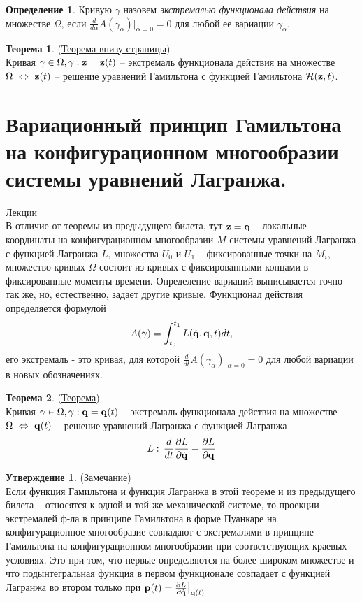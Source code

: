 \documentclass[specialist, subf, href, colorlinks=true, 12pt, times, mtpro, final]{disser}
\theoremstyle{definition}
\newtheorem{defn}{Определение}[section]
\newtheorem{state}{Утверждение}[section]
\newtheorem{theorem}{Теорема}[section]
\def\bfqd{\dot{\bfq}}
\begin{document}
    \begin{defn}
    Кривую $\gamma$  назовем {\it экстремалью функционала действия} на множестве $\Omega$, если $\frac{d}{d\alpha} A(\gamma_\alpha)|_{\alpha=0}=0$ для любой ее вариации $\gamma_\alpha$.
    \end{defn}
        
    \begin{theorem}(\hyperlink {lects.44}{Теорема внизу страницы})\\
    Кривая $\gamma \in \Omega, \gamma: \mathbf{z}=\mathbf{z}(t)$ \--- экстремаль функционала действия на множестве $\Omega\,\, \Leftrightarrow\,\, \mathbf{z}(t)$ \--- решение уравнений Гамильтона с функцией Гамильтона $\mathcal{H}(\mathbf{z}, t)$.
    \end{theorem}
    
    
    \section{Вариационный принцип Гамильтона на конфигурационном многообразии системы уравнений Лагранжа.}
     \label{25}
    \hyperlink {lects.45}{Лекции}\\
    В отличие от теоремы из предыдущего билета, тут $\mathbf{z}=\mathbf{q}$ -- локальные координаты
    на конфигурационном многообразии $M$ системы уравнений Лагранжа с функцией Лагранжа $L$,
    множества $U_0$ и $U_1$ -- фиксированные точки на $M_i$, множество кривых $\Omega$
    состоит из кривых с фиксированными концами в фиксированные моменты времени. Определение
    вариаций выписывается точно так же, но, естественно, задает другие кривые. Функционал
    действия определяется формулой
    $$A(\gamma) = \int_{t_0}^{t_1} L(\bfqd,\bfq,t)dt,$$
    его экстремаль - это кривая, для которой $\frac{d}{dt}A(\gamma_{\alpha})|_{\alpha=0}=0$
    для любой вариации в новых обозначениях.
    \begin{theorem}(\hyperlink {lects.46}{Теорема}) \\
    Кривая $\gamma \in \Omega, \gamma: \mathbf{q} = \mathbf{q} (t)$ \--- экстремаль функционала действия на множестве $\Omega\,\, \Leftrightarrow\,\, \mathbf{q}(t)$ \--- решение уравнений Лагранжа с функцией Лагранжа 
    $$
    L:\, \frac{d}{dt} \frac{\partial L}{\partial \dot{\mathbf{q}}} - \frac{\partial L}{\partial \mathbf{q}}
    $$
    \end{theorem}
    
    \begin{state}(\hyperlink {lects.46}{Замечание})\\
    Если функция Гамильтона и функция Лагранжа в этой теореме и из предыдущего билета \--- относятся к одной и той же механической системе, то проекции экстремалей ф-ла в принципе Гамильтона в форме Пуанкаре на конфигурационное многообразие совпадают с экстремалями в принципе Гамильтона на конфигурационном многообразии при соответствующих краевых условиях. Это при том, что первые определяются на более широком множестве и что подынтегральная функция в первом функционале совпадает с функцией Лагранжа во втором только при $\bfp(t) = \frac{\partial L}{\partial\bfqd} \big|_{\bfq(t)}$
    \end{state}
    
\end{document}
